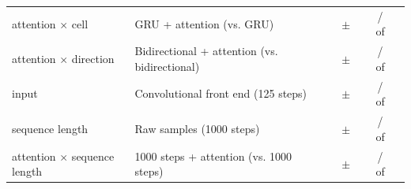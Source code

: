 \begin{tabular}{llrrcrcc}
\addlinespace
attention $\times$ cell & GRU + attention (vs. GRU) & \rnnParamsGruAttn{} & \rnnStepsGruAttn{} & \rnnValAurocMeanGruAttn{} $\pm$ \rnnValAurocSdGruAttn{} & \rnnDiffMeanGruAttn{} & \rnnNSeedsBetterGruAttn{} / \rnnNSeedsWorseGruAttn{} of \rnnNSeedsComparedGruAttn{} & \rnnSensLastGruAttn{} \\
\addlinespace
attention $\times$ direction & Bidirectional + attention (vs. bidirectional) & \rnnParamsBiAttn{} & \rnnStepsBiAttn{} & \rnnValAurocMeanBiAttn{} $\pm$ \rnnValAurocSdBiAttn{} & \rnnDiffMeanBiAttn{} & \rnnNSeedsBetterBiAttn{} / \rnnNSeedsWorseBiAttn{} of \rnnNSeedsComparedBiAttn{} & \rnnSensLastBiAttn{} \\
\addlinespace
input & Convolutional front end (125 steps) & \rnnParamsConv{} & \rnnStepsConv{} & \rnnValAurocMeanConv{} $\pm$ \rnnValAurocSdConv{} & \rnnDiffMeanConv{} & \rnnNSeedsBetterConv{} / \rnnNSeedsWorseConv{} of \rnnNSeedsComparedConv{} & \rnnSensLastConv{} \\
\addlinespace
sequence length & Raw samples (1000 steps) & \rnnParamsRaw{} & \rnnStepsRaw{} & \rnnValAurocMeanRaw{} $\pm$ \rnnValAurocSdRaw{} & \rnnDiffMeanRaw{} & \rnnNSeedsBetterRaw{} / \rnnNSeedsWorseRaw{} of \rnnNSeedsComparedRaw{} & \rnnSensLastRaw{} \\
\addlinespace
attention $\times$ sequence length & 1000 steps + attention (vs. 1000 steps) & \rnnParamsRawAttn{} & \rnnStepsRawAttn{} & \rnnValAurocMeanRawAttn{} $\pm$ \rnnValAurocSdRawAttn{} & \rnnDiffMeanRawAttn{} & \rnnNSeedsBetterRawAttn{} / \rnnNSeedsWorseRawAttn{} of \rnnNSeedsComparedRawAttn{} & \rnnSensLastRawAttn{} \\
\bottomrule
\end{tabular}
